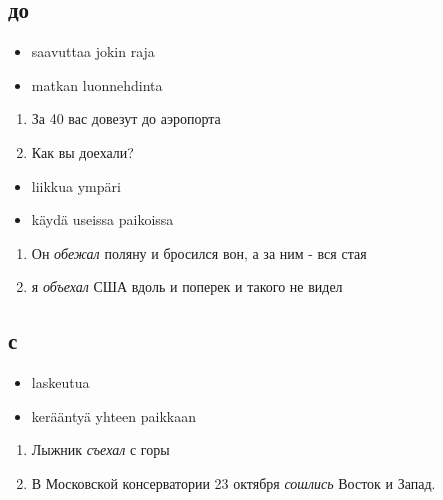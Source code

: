 \documentclass[]{scrreprt}
\providecommand{\tightlist}{%
  \setlength{\itemsep}{0pt}\setlength{\parskip}{0pt}}
\begin{document}
\subsection{до}\label{ux434ux43e}

\begin{itemize}
\tightlist
\item
  saavuttaa jokin raja
\item
  matkan luonnehdinta
\end{itemize}

\begin{enumerate}
\def\labelenumi{(\arabic{enumi})}
\setcounter{enumi}{437}
\tightlist
\item
  За 40 вас довезут до аэропорта
\item
  Как вы доехали?
\end{enumerate}


\begin{itemize}
\tightlist
\item
  liikkua ympäri
\item
  käydä useissa paikoissa
\end{itemize}

\begin{enumerate}
\def\labelenumi{(\arabic{enumi})}
\setcounter{enumi}{439}
\tightlist
\item
  Он \emph{обежал} поляну и бросился вон, а за ним - вся стая
\item
  я \emph{объехал} США вдоль и поперек и такого не видел
\end{enumerate}

\subsection{с}\label{ux441}

\begin{itemize}
\tightlist
\item
  laskeutua
\item
  kerääntyä yhteen paikkaan
\end{itemize}

\begin{enumerate}
\def\labelenumi{(\arabic{enumi})}
\setcounter{enumi}{441}
\tightlist
\item
  Лыжник \emph{съехал} с горы
\item
  В Московской консерватории 23 октября \emph{сошлись} Восток и Запад.
\end{enumerate}
\end{document}
